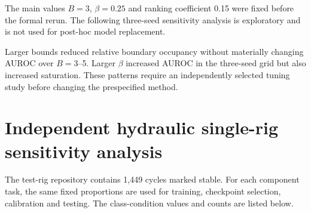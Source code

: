 \documentclass[10pt]{article}
\begin{document}
The main values $B=3$, $\beta=0.25$ and ranking coefficient 0.15 were fixed before the formal rerun. The following three-seed sensitivity analysis is exploratory and is not used for post-hoc model replacement.

\begin{table}[ht]
\centering
\caption{Bound, weighting-strength and ranking-weight sensitivity. Saturation denotes the affected fraction with $|r|\geq0.95B$.}
\resizebox{0.70\textwidth}{!}{}
\end{table}

Larger bounds reduced relative boundary occupancy without materially changing AUROC over $B=3$--5. Larger $\beta$ increased AUROC in the three-seed grid but also increased saturation. These patterns require an independently selected tuning study before changing the prespecified method.

\section{Independent hydraulic single-rig sensitivity analysis}

The test-rig repository contains 1,449 cycles marked stable. For each component task, the same fixed proportions are used for training, checkpoint selection, calibration and testing. The class-condition values and counts are listed below.

\begin{table}[ht]
\centering
\caption{Hydraulic cooler and valve condition values and split counts.}
\begin{minipage}{0.47\textwidth}\centering\resizebox{\textwidth}{!}{}\end{minipage}\hfill
\begin{minipage}{0.47\textwidth}\centering\resizebox{\textwidth}{!}{}\end{minipage}
\end{table}

\begin{table}[ht]
\centering
\caption{Hydraulic pump and accumulator condition values and split counts.}
\begin{minipage}{0.47\textwidth}\centering\resizebox{\textwidth}{!}{}\end{minipage}\hfill
\begin{minipage}{0.47\textwidth}\centering\resizebox{\textwidth}{!}{}\end{minipage}
\end{table}
\end{document}
